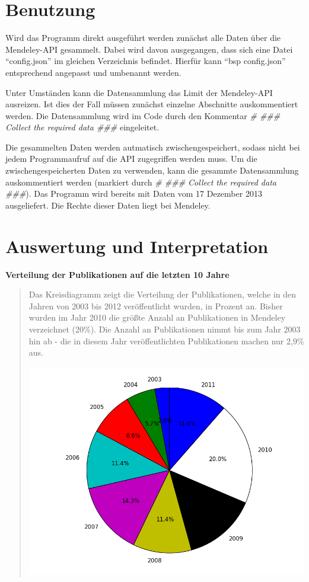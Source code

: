 \documentclass[letterpaper,10pt,english]{sphinxmanual}
\begin{document}
\section{Benutzung}
\label{project_3:benutzung}
Wird das Programm direkt ausgeführt werden zunächst alle Daten über die Mendeley-API gesammelt. Dabei wird davon ausgegangen, dass sich eine Datei ``config.json'' im gleichen Verzeichnis befindet. Hierfür kann ``bsp config.json'' entsprechend angepasst und umbenannt werden.

Unter Umständen kann die Datensammlung das Limit der Mendeley-API ausreizen. Ist dies der Fall müssen zunächst einzelne Abschnitte auskommentiert werden. Die Datensammlung wird im Code durch den Kommentar \emph{\# \#\#\# Collect the required data \#\#\#} eingeleitet.

Die gesammelten Daten werden autmatisch zwischengespeichert, sodass nicht bei jedem Programmaufruf auf die API zugegriffen werden muss. Um die zwischengespeicherten Daten zu verwenden, kann die gesammte Datensammlung auskommentiert werden (markiert durch \emph{\# \#\#\# Collect the required data \#\#\#}).
Das Programm wird bereits mit Daten vom 17 Dezember 2013 ausgeliefert. Die Rechte dieser Daten liegt bei Mendeley.


\section{Auswertung und Interpretation}
\label{project_3:auswertung-und-interpretation}
\textbf{Verteilung der Publikationen auf die letzten 10 Jahre}
\begin{quote}

Das Kreisdiagramm zeigt die Verteilung der Publikationen, welche in den Jahren von 2003 bis 2012 veröffentlicht wurden, in Prozent an. Bisher wurden im Jahr 2010 die größte Anzahl an Publikationen in Mendeley verzeichnet (20\%). Die Anzahl an Publikationen nimmt bis zum Jahr 2003 hin ab - die in diesem Jahr veröffentlichten Publikationen machen nur 2,9\% aus.

\includegraphics{Verteilung_overall.png}
\end{quote}
\end{document}
